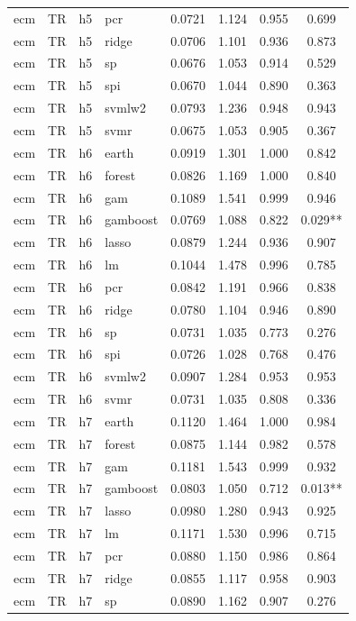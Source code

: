 \begin{ThreePartTable}
\begin{longtable}[t]{llclcccc}
ecm & TR & h5 & pcr & 0.0721 & 1.124 & 0.955 & 0.699\\
ecm & TR & h5 & ridge & 0.0706 & 1.101 & 0.936 & 0.873\\
ecm & TR & h5 & sp & 0.0676 & 1.053 & 0.914 & 0.529\\
ecm & TR & h5 & spi & 0.0670 & 1.044 & 0.890 & 0.363\\
ecm & TR & h5 & svmlw2 & 0.0793 & 1.236 & 0.948 & 0.943\\
ecm & TR & h5 & svmr & 0.0675 & 1.053 & 0.905 & 0.367\\
\addlinespace
ecm & TR & h6 & earth & 0.0919 & 1.301 & 1.000 & 0.842\\
ecm & TR & h6 & forest & 0.0826 & 1.169 & 1.000 & 0.840\\
ecm & TR & h6 & gam & 0.1089 & 1.541 & 0.999 & 0.946\\
ecm & TR & h6 & gamboost & 0.0769 & 1.088 & 0.822 & 0.029**\\
ecm & TR & h6 & lasso & 0.0879 & 1.244 & 0.936 & 0.907\\
ecm & TR & h6 & lm & 0.1044 & 1.478 & 0.996 & 0.785\\
ecm & TR & h6 & pcr & 0.0842 & 1.191 & 0.966 & 0.838\\
ecm & TR & h6 & ridge & 0.0780 & 1.104 & 0.946 & 0.890\\
ecm & TR & h6 & sp & 0.0731 & 1.035 & 0.773 & 0.276\\
ecm & TR & h6 & spi & 0.0726 & 1.028 & 0.768 & 0.476\\
ecm & TR & h6 & svmlw2 & 0.0907 & 1.284 & 0.953 & 0.953\\
ecm & TR & h6 & svmr & 0.0731 & 1.035 & 0.808 & 0.336\\
\addlinespace
ecm & TR & h7 & earth & 0.1120 & 1.464 & 1.000 & 0.984\\
ecm & TR & h7 & forest & 0.0875 & 1.144 & 0.982 & 0.578\\
ecm & TR & h7 & gam & 0.1181 & 1.543 & 0.999 & 0.932\\
ecm & TR & h7 & gamboost & 0.0803 & 1.050 & 0.712 & 0.013**\\
ecm & TR & h7 & lasso & 0.0980 & 1.280 & 0.943 & 0.925\\
ecm & TR & h7 & lm & 0.1171 & 1.530 & 0.996 & 0.715\\
ecm & TR & h7 & pcr & 0.0880 & 1.150 & 0.986 & 0.864\\
ecm & TR & h7 & ridge & 0.0855 & 1.117 & 0.958 & 0.903\\
ecm & TR & h7 & sp & 0.0890 & 1.162 & 0.907 & 0.276\\

\end{longtable}
\end{ThreePartTable}
